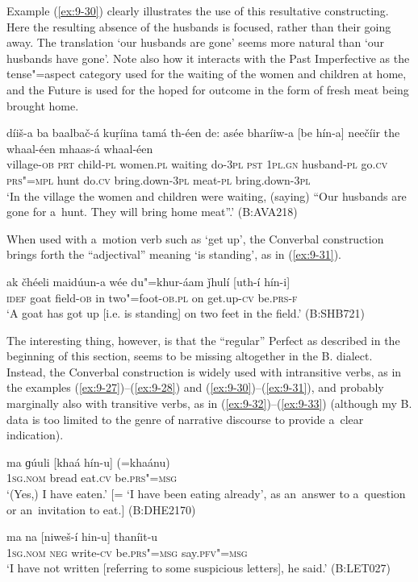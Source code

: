 Example (\ref{ex:9-30}) clearly illustrates the use of this resultative constructing. Here the resulting absence of the husbands is focused, rather than their going away. The translation `our husbands are gone' seems more natural than `our husbands have gone'. Note also how it interacts with the Past Imperfective as the tense"=aspect category used for the waiting of the women and children at home, and the Future is used for the hoped for outcome in the form of fresh meat being brought home.

\begin{exe}
\ex
\label{ex:9-30}
\gll díiš-a ba baalbač-á kuṛíina tamá th-éen de: asée bharíiw-a [be hín-a] neečíir the whaal-éen mhaas-á whaal-éen \\
village-\textsc{ob} \textsc{prt} child-\textsc{pl} women.\textsc{pl} waiting  do-\textsc{3pl} \textsc{pst } \textsc{1pl.gn} husband-\textsc{pl} go.\textsc{cv} \textsc{prs"=mpl}  hunt do.\textsc{cv} bring.down-\textsc{3pl} meat-\textsc{pl} bring.down-\textsc{3pl} \\
\glt `In the village the women and children were waiting, (saying) ``Our husbands are gone for a~hunt. They will bring home meat''.' (B:AVA218)
\end{exe}

When used with a~motion verb such as `get up', the Converbal construction brings forth the ``adjectival'' meaning `is standing', as in (\ref{ex:9-31}).

\begin{exe}
\ex
\label{ex:9-31}
\gll ak čhéeli maidúun-a wée du"=khur-áam ǰhulí [uth-í hín-i] \\
\textsc{idef} goat field-\textsc{ob} in two"=foot-\textsc{ob.pl} on get.up-\textsc{cv} be.\textsc{prs-f} \\
\glt `A goat has got up [i.e. is standing] on two feet in the field.' (B:SHB721)
\end{exe}

The interesting thing, however, is that the ``regular'' Perfect as described in the beginning of this section, seems to be missing altogether in the B. dialect. Instead, the Converbal construction is widely used with intransitive verbs, as in the examples (\ref{ex:9-27})--(\ref{ex:9-28}) and (\ref{ex:9-30})--(\ref{ex:9-31}), and probably marginally also with transitive verbs, as in (\ref{ex:9-32})--(\ref{ex:9-33}) (although my B. data is too limited to the genre of narrative discourse to provide a~clear indication).

\begin{exe}
\ex
\label{ex:9-32}
\gll ma ɡúuli [khaá hín-u] (=khaánu)  \\
\textsc{1sg.nom} bread eat.\textsc{cv} be.\textsc{prs"=msg} \\
\glt `(Yes,) I have eaten.' [= `I have been eating already', as an~answer to a~question or an~invitation to eat.] (B:DHE2170)

\ex
\label{ex:9-33}
\gll ma na [niweš-í hin-u] thaníit-u  \\
\textsc{1sg.nom} \textsc{neg} write-\textsc{cv} be.\textsc{prs"=msg} say.\textsc{pfv"=msg} \\
\glt `I have not written [referring to some suspicious letters], he said.' (B:LET027)
\end{exe}

